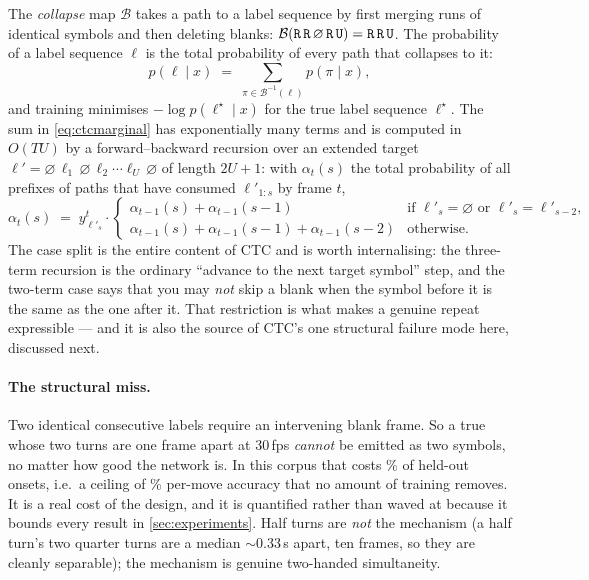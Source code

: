 The \emph{collapse} map $\mathcal{B}$ takes a path to a label sequence by
first merging runs of identical symbols and then deleting blanks:
$\mathcal{B}(\texttt{R}\,\texttt{R}\,\varnothing\,\texttt{R}\,\texttt{U}) =
\texttt{R}\,\texttt{R}\,\texttt{U}$. The probability of a label sequence $\ell$ is
the total probability of every path that collapses to it:
\begin{equation}
p(\ell \mid x) \;=\; \sum_{\pi \in \mathcal{B}^{-1}(\ell)} p(\pi \mid x),
\label{eq:ctcmarginal}
\end{equation}
and training minimises $-\log p(\ell^\star \mid x)$ for the true label
sequence $\ell^\star$. The sum in \cref{eq:ctcmarginal} has exponentially
many terms and is computed in $O(TU)$ by a forward--backward recursion over
an extended target $\ell' = \varnothing\, \ell_1\, \varnothing\, \ell_2
\cdots \ell_U\, \varnothing$ of length $2U+1$: with
$\alpha_t(s)$ the total probability of all prefixes of paths that have
consumed $\ell'_{1:s}$ by frame $t$,
\begin{equation}
\alpha_t(s) \;=\; y^t_{\ell'_s}\cdot
\begin{cases}
\alpha_{t-1}(s) + \alpha_{t-1}(s-1)
  & \text{if } \ell'_s = \varnothing \text{ or } \ell'_s = \ell'_{s-2},\\[2pt]
\alpha_{t-1}(s) + \alpha_{t-1}(s-1) + \alpha_{t-1}(s-2)
  & \text{otherwise.}
\end{cases}
\label{eq:ctcforward}
\end{equation}
The case split is the entire content of CTC and is worth internalising: the
three-term recursion is the ordinary ``advance to the next target symbol''
step, and the two-term case says that you may \emph{not} skip a blank when
the symbol before it is the same as the one after it. That restriction is
what makes a genuine repeat expressible --- and it is also the source of
CTC's one structural failure mode here, discussed next.

\paragraph{The structural miss.} Two identical consecutive labels require an
intervening blank frame. So a true \, whose two turns are one
frame apart at 30\,fps \emph{cannot} be emitted as two symbols, no matter how
good the network is. In this corpus that costs
\CTCFloorHoldout\% of held-out onsets, i.e.\ a ceiling of
\CTCCeilingHoldout\% per-move accuracy that no amount of training removes.
It is a real cost of the design, and it is quantified rather than waved at
because it bounds every result in \cref{sec:experiments}. Half turns are
\emph{not} the mechanism (a half turn's two quarter turns are a median
$\sim$0.33\,s apart, ten frames, so they are cleanly separable); the
mechanism is genuine two-handed simultaneity.

